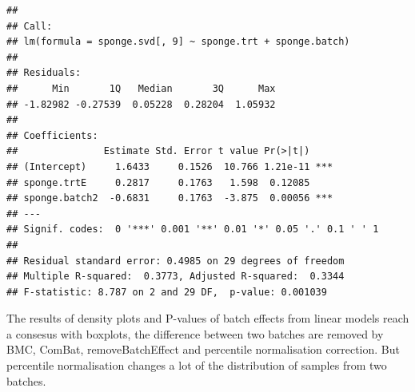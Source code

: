 \documentclass[]{book}
\begin{document}
\begin{verbatim}
## 
## Call:
## lm(formula = sponge.svd[, 9] ~ sponge.trt + sponge.batch)
## 
## Residuals:
##      Min       1Q   Median       3Q      Max 
## -1.82982 -0.27539  0.05228  0.28204  1.05932 
## 
## Coefficients:
##               Estimate Std. Error t value Pr(>|t|)    
## (Intercept)     1.6433     0.1526  10.766 1.21e-11 ***
## sponge.trtE     0.2817     0.1763   1.598  0.12085    
## sponge.batch2  -0.6831     0.1763  -3.875  0.00056 ***
## ---
## Signif. codes:  0 '***' 0.001 '**' 0.01 '*' 0.05 '.' 0.1 ' ' 1
## 
## Residual standard error: 0.4985 on 29 degrees of freedom
## Multiple R-squared:  0.3773, Adjusted R-squared:  0.3344 
## F-statistic: 8.787 on 2 and 29 DF,  p-value: 0.001039
\end{verbatim}

The results of density plots and P-values of batch effects from linear
models reach a consesus with boxplots, the difference between two
batches are removed by BMC, ComBat, removeBatchEffect and percentile
normalisation correction. But percentile normalisation changes a lot of
the distribution of samples from two batches.
\end{document}
